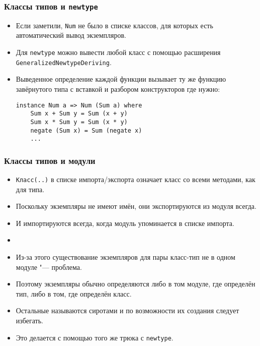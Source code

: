 \documentclass[10pt]{beamer}
\begin{document}
\begin{frame}[fragile]
\frametitle{Классы типов и \lstinline|newtype|}
\begin{itemize}
    \item Если заметили, \lstinline|Num| не было в списке классов, для которых есть автоматический вывод экземпляров.
    \item Для \lstinline|newtype| можно вывести любой класс с помощью расширения \lstinline|GeneralizedNewtypeDeriving|.\pause
    \item Выведенное определение каждой функции вызывает ту же функцию завёрнутого типа с вставкой и разбором конструкторов где нужно:
\begin{lstlisting}
instance Num a => Num (Sum a) where
    Sum x + Sum y = Sum (x + y)
    Sum x * Sum y = Sum (x * y)
    negate (Sum x) = Sum (negate x)
    ...
\end{lstlisting}
\end{itemize}
\end{frame}

\begin{frame}[fragile]
\frametitle{Классы типов и модули}
\begin{itemize}
    \item \lstinline|Класс(..)| в списке импорта/экспорта означает класс со всеми методами, как для типа.
    \item Поскольку экземпляры не имеют имён, они экспортируются из модуля всегда.
    \item И импортируются всегда, когда модуль упоминается в списке импорта.\pause
    \item[]
    \item Из-за этого существование экземпляров для пары класс-тип не в одном модуле "--- проблема.
    \item Поэтому экземпляры обычно определяются либо в том модуле, где определён тип, либо в том, где определён класс.
    \item Остальные называются сиротами и по возможности их создания следует избегать.
    \item Это делается с помощью того же трюка с \lstinline|newtype|.
\end{itemize}
\end{frame}
\end{document}
